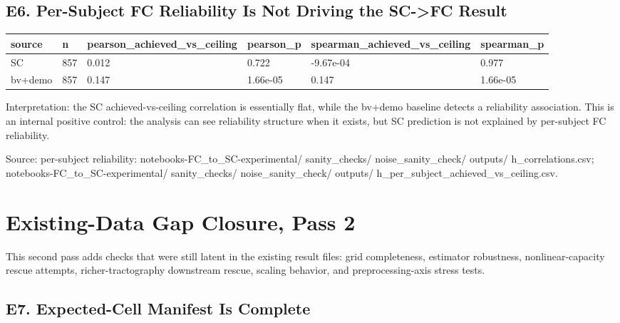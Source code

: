 \subsection{E6. Per-Subject FC Reliability Is Not Driving the SC-\textgreater FC Result}\label{e6-per-subject-fc-reliability-is-not-driving-the-sc-fc-result}

{\def\LTcaptype{none} %
\begin{longtable}[]{@{}llllll@{}}
\toprule\noalign{}
source & n & pearson\_achieved\_vs\_ceiling & pearson\_p & spearman\_achieved\_vs\_ceiling & spearman\_p \\
\midrule\noalign{}
\endhead
\bottomrule\noalign{}
\endlastfoot
SC & 857 & 0.012 & 0.722 & -9.67e-04 & 0.977 \\
bv+demo & 857 & 0.147 & 1.66e-05 & 0.147 & 1.66e-05 \\
\end{longtable}
}

Interpretation: the SC achieved-vs-ceiling correlation is essentially flat, while the bv+demo baseline detects a reliability association. This is an internal positive control: the analysis can see reliability structure when it exists, but SC prediction is not explained by per-subject FC reliability.

Source: per-subject reliability: notebooks-FC\_to\_SC-experimental/ sanity\_checks/ noise\_sanity\_check/ outputs/ h\_correlations.csv; notebooks-FC\_to\_SC-experimental/ sanity\_checks/ noise\_sanity\_check/ outputs/ h\_per\_subject\_achieved\_vs\_ceiling.csv.

\section{Existing-Data Gap Closure, Pass 2}\label{existing-data-gap-closure-pass-2}

This second pass adds checks that were still latent in the existing result files: grid completeness, estimator robustness, nonlinear-capacity rescue attempts, richer-tractography downstream rescue, scaling behavior, and preprocessing-axis stress tests.

\subsection{E7. Expected-Cell Manifest Is Complete}\label{e7-expected-cell-manifest-is-complete}

